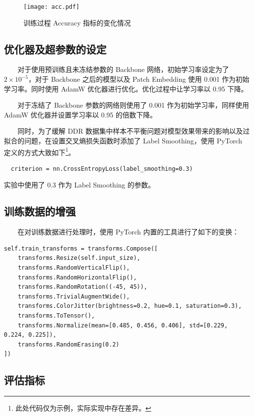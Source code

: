 \documentclass[twocolumn, fontsize=10pt]{article}
\begin{document}
\begin{figure}[h!]
    \centering
    \texttt{[image: acc.pdf]}
    \caption{训练过程 Accuracy 指标的变化情况}
    \label{fig:acc}
\end{figure}

\subsection{优化器及超参数的设定}

　　对于使用预训练且未冻结参数的 Backbone 网络，初始学习率设定为了 $2\times 10^{-5}$，对于 Backbone 之后的模型以及 Patch Embedding 使用 0.001 作为初始学习率。同时使用 AdamW 优化器\cite{loshchilov2017}进行优化。优化过程中让学习率以 0.95 下降。

　　对于冻结了 Backbone 参数的网络则使用了 0.001 作为初始学习率，同样使用 AdamW 优化器并设置学习率以 0.95 的倍数下降。

　　同时，为了缓解 DDR 数据集中样本不平衡问题对模型效果带来的影响以及过拟合的问题，在设置交叉熵损失函数时添加了 Label Smoothing，使用 PyTorch 定义的方式大致如下\footnote{此处代码仅为示例，实际实现中存在差异。}。
\begin{verbatim}
  criterion = nn.CrossEntropyLoss(label_smoothing=0.3)
\end{verbatim}
实验中使用了 0.3 作为 Label Smoothing 的参数。

\subsection{训练数据的增强}

　　在对训练数据进行处理时，使用 PyTorch 内置的工具进行了如下的变换：

\begin{verbatim}
self.train_transforms = transforms.Compose([
    transforms.Resize(self.input_size),
    transforms.RandomVerticalFlip(),
    transforms.RandomHorizontalFlip(),
    transforms.RandomRotation((-45, 45)),
    transforms.TrivialAugmentWide(),
    transforms.ColorJitter(brightness=0.2, hue=0.1, saturation=0.3),
    transforms.ToTensor(),
    transforms.Normalize(mean=[0.485, 0.456, 0.406], std=[0.229, 0.224, 0.225]),
    transforms.RandomErasing(0.2)
])
\end{verbatim}


\subsection{评估指标}
\end{document}
